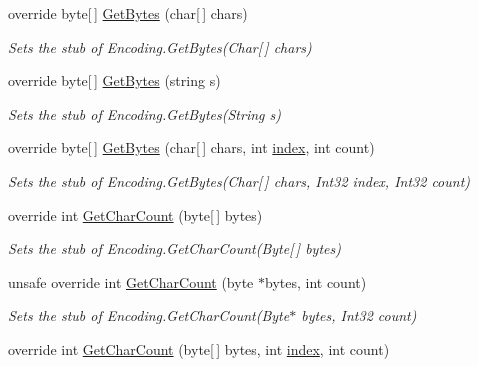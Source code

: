 \begin{DoxyCompactItemize}
override byte\mbox{[}$\,$\mbox{]} \hyperlink{class_system_1_1_text_1_1_fakes_1_1_stub_encoding_a206062cd7182174bb87f68517d23a4f6}{Get\-Bytes} (char\mbox{[}$\,$\mbox{]} chars)
\begin{DoxyCompactList}\small\item\em Sets the stub of Encoding.\-Get\-Bytes(\-Char\mbox{[}$\,$\mbox{]} chars)\end{DoxyCompactList}\item 
override byte\mbox{[}$\,$\mbox{]} \hyperlink{class_system_1_1_text_1_1_fakes_1_1_stub_encoding_ae1b47f0e997761271a8021fb6e3eb9aa}{Get\-Bytes} (string s)
\begin{DoxyCompactList}\small\item\em Sets the stub of Encoding.\-Get\-Bytes(\-String s)\end{DoxyCompactList}\item 
override byte\mbox{[}$\,$\mbox{]} \hyperlink{class_system_1_1_text_1_1_fakes_1_1_stub_encoding_a71a4fc87a64b9f6e63852a98bfe8dc0a}{Get\-Bytes} (char\mbox{[}$\,$\mbox{]} chars, int \hyperlink{jquery-1_810_82-vsdoc_8js_a75bb12d1f23302a9eea93a6d89d0193e}{index}, int count)
\begin{DoxyCompactList}\small\item\em Sets the stub of Encoding.\-Get\-Bytes(\-Char\mbox{[}$\,$\mbox{]} chars, Int32 index, Int32 count)\end{DoxyCompactList}\item 
override int \hyperlink{class_system_1_1_text_1_1_fakes_1_1_stub_encoding_a25213aedab36d053dee5c6be863f2c95}{Get\-Char\-Count} (byte\mbox{[}$\,$\mbox{]} bytes)
\begin{DoxyCompactList}\small\item\em Sets the stub of Encoding.\-Get\-Char\-Count(\-Byte\mbox{[}$\,$\mbox{]} bytes)\end{DoxyCompactList}\item 
unsafe override int \hyperlink{class_system_1_1_text_1_1_fakes_1_1_stub_encoding_a3f953febfbfb52aea962704d4970849c}{Get\-Char\-Count} (byte $\ast$bytes, int count)
\begin{DoxyCompactList}\small\item\em Sets the stub of Encoding.\-Get\-Char\-Count(\-Byte$\ast$ bytes, Int32 count)\end{DoxyCompactList}\item 
override int \hyperlink{class_system_1_1_text_1_1_fakes_1_1_stub_encoding_a8185ed920b08e1a321d3553a4aa3f510}{Get\-Char\-Count} (byte\mbox{[}$\,$\mbox{]} bytes, int \hyperlink{jquery-1_810_82-vsdoc_8js_a75bb12d1f23302a9eea93a6d89d0193e}{index}, int count)

\end{DoxyCompactItemize}
